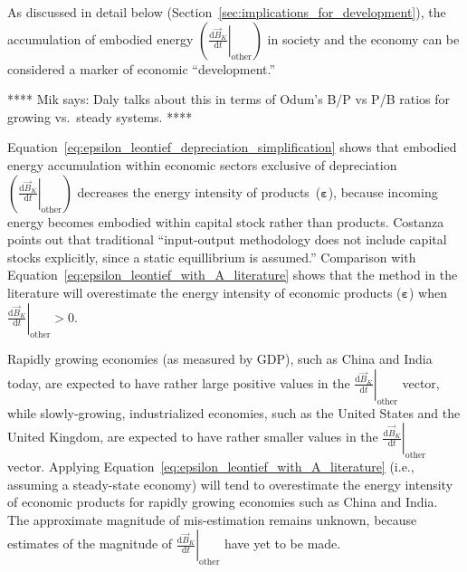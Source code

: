 As discussed in detail below (Section~\ref{sec:implications_for_development}),
the accumulation of embodied energy 
$\left( \left. \frac{\mathrm{d}\vec{B}_{K}}{\mathrm{d}t} \right|_{\mathrm{other}} \right)$
in society and the economy
can be considered a marker of economic ``development.''

**** 
Mik says: Daly talks about this in terms 
of Odum's B/P vs P/B ratios for growing vs.\ steady systems.
****

Equation~\ref{eq:epsilon_leontief_depreciation_simplification} 
shows that embodied energy accumulation within economic sectors 
exclusive of depreciation
$\left( \left. \frac{\mathrm{d}\vec{B}_{K}}{\mathrm{d}t} \right|_{\mathrm{other}} \right)$ 
decreases the energy intensity of products~($\bm{\varepsilon}$),
because incoming energy becomes embodied within capital stock rather than products.
Costanza points out that traditional
``input-output methodology does not include capital stocks explicitly, 
since a static equillibrium is assumed.''\cite{Costanza:1980ww}
Comparison with Equation~\ref{eq:epsilon_leontief_with_A_literature}
shows that the method in the literature will overestimate the energy intensity
of economic products ($\bm{\varepsilon}$) when 
$\left. \frac{\mathrm{d}\vec{B}_{K}}{\mathrm{d}t} \right|_{\mathrm{other}} > 0$.

Rapidly growing economies (as measured by GDP), such as China and India today,
are expected to have rather large positive values in the  
$\left. \frac{\mathrm{d}\vec{B}_{K}}{\mathrm{d}t} \right|_{\mathrm{other}}$ vector,
while slowly-growing, industrialized economies, 
such as the United States and the United Kingdom,
are expected to have rather smaller values in the 
$\left. \frac{\mathrm{d}\vec{B}_{K}}{\mathrm{d}t} \right|_{\mathrm{other}}$ vector.
Applying Equation~\ref{eq:epsilon_leontief_with_A_literature} 
(i.e., assuming a steady-state economy)
will tend to overestimate the energy intensity 
of economic products for rapidly growing economies such as China and India.
The approximate magnitude of mis-estimation remains unknown, because
estimates of the magnitude of
$\left. \frac{\mathrm{d}\vec{B}_{K}}{\mathrm{d}t} \right|_{\mathrm{other}}$
have yet to be made.

